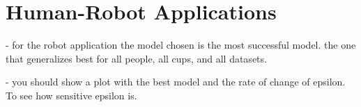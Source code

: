 \section{Human-Robot Applications}
- for the robot application the model chosen is the most successful model. the one that generalizes best for all people, all cups, and all datasets. 

- you should show a plot with the best model and the rate of change of epsilon. To see how sensitive epsilon is. 